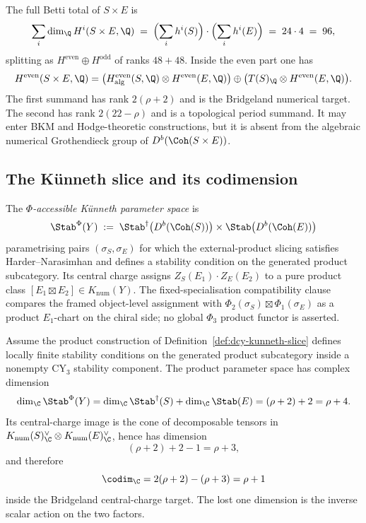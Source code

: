 \begin{remark}
\label{rem:dcy-stab-48-vs-96-scope}
The full Betti total of $S \times E$ is
\[
 \sum_i \dim_\Q H^i(S \times E, \Q)
 \;=\; \Bigl(\sum_i h^i(S)\Bigr) \cdot \Bigl(\sum_i h^i(E)\Bigr)
 \;=\; 24 \cdot 4 \;=\; 96,
\]
splitting as $H^{\mathrm{even}} \oplus H^{\mathrm{odd}}$ of ranks $48+48$. Inside the even part one has
\[
 H^{\mathrm{even}}(S\times E,\Q)
 =
 \bigl(H^{\mathrm{even}}_{\mathrm{alg}}(S,\Q)\otimes H^{\mathrm{even}}(E,\Q)\bigr)
 \oplus
 \bigl(T(S)_\Q\otimes H^{\mathrm{even}}(E,\Q)\bigr).
\]
The first summand has rank $2(\rho+2)$ and is the Bridgeland numerical target. The second has rank $2(22-\rho)$ and is a topological period summand. It may enter BKM and Hodge-theoretic constructions, but it is absent from the algebraic numerical Grothendieck group of $D^b(\Coh(S\times E))$.
\end{remark}

\subsection{The Künneth slice and its codimension}
\label{subsec:dcy-kunneth-slice-codim}

\begin{definition}
\label{def:dcy-kunneth-slice}
The \emph{$\Phi$-accessible K\"unneth parameter space} is
\[
 \Stab^\Phi(Y) \;:=\; \Stab^\dagger\bigl(D^b(\Coh(S))\bigr) \times \Stab\bigl(D^b(\Coh(E))\bigr)
\]
parametrising pairs $(\sigma_S, \sigma_E)$ for which the external-product slicing satisfies Harder--Narasimhan and defines a stability condition on the generated product subcategory. Its central charge assigns $Z_S(E_1) \cdot Z_E(E_2)$ to a pure product class $[E_1 \boxtimes E_2] \in K_{\mathrm{num}}(Y)$. The fixed-specialisation compatibility clause compares the framed object-level assignment with $\Phi_2(\sigma_S) \boxtimes \Phi_1(\sigma_E)$ as a product $E_1$-chart on the chiral side; no global $\Phi_3$ product functor is asserted.
\end{definition}

\begin{proposition}
\label{prop:dcy-kunneth-codim-22}
Assume the product construction of Definition~\ref{def:dcy-kunneth-slice}
defines locally finite stability conditions on the generated product
subcategory inside a nonempty CY$_3$ stability component.
The product parameter space has complex dimension
\[
 \dim_\C \Stab^\Phi(Y)
 =
 \dim_\C \Stab^\dagger(S)+\dim_\C\Stab(E)
 =
 (\rho+2)+2
 =
 \rho+4.
\]
Its central-charge image is the cone of decomposable tensors in
$K_{\mathrm{num}}(S)^\vee_\C\otimes K_{\mathrm{num}}(E)^\vee_\C$, hence has dimension
\[
 (\rho+2)+2-1=\rho+3,
\]
and therefore
\[
 \codim_\C
 =
 2(\rho+2)-(\rho+3)
 =
 \rho+1
\]
inside the Bridgeland central-charge target. The lost one dimension is the inverse scalar action on the two factors.
\end{proposition}

